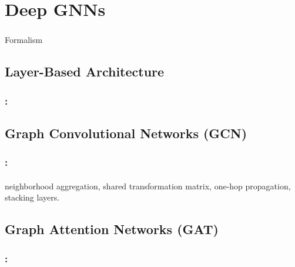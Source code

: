 \documentclass[xcolor=table]{beamer}
\begin{document}
\section{Deep GNNs}

\begin{frame}
	\frametitle{\insertshortsubtitle}
	\framesubtitle{\insertsection}
	
	Formalism
	
\end{frame}

\subsection{Layer-Based Architecture}

\begin{frame}
	\frametitle{\insertshortsubtitle: \insertsection}
	\framesubtitle{\insertsubsection}
	
	 
	
\end{frame}

\subsection{Graph Convolutional Networks (GCN)}

\begin{frame}
	\frametitle{\insertshortsubtitle: \insertsection}
	\framesubtitle{\insertsubsection}
	
	neighborhood aggregation,
	shared transformation matrix,
	one-hop propagation,
	stacking layers.
	
\end{frame}

\subsection{Graph Attention Networks (GAT)}

\begin{frame}
	\frametitle{\insertshortsubtitle: \insertsection}
	\framesubtitle{\insertsubsection}
	
	
\end{frame}

\end{document}
